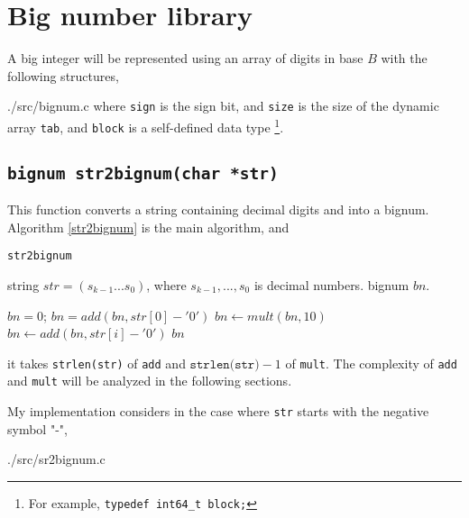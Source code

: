 \section{Big number library}
A big integer will be represented using an array of digits in base $B$ with the
following structures,

{./src/bignum.c}
where \texttt{sign} is the sign bit, and \texttt{size} is the size of the
dynamic array \texttt{tab}, and \texttt{block} is a self-defined data type
\footnote{For example, \texttt{typedef int64\_t block;}}.

\subsection{\texttt{bignum str2bignum(char *str)}}
This function converts a string containing decimal digits and into a bignum.
Algorithm \ref{str2bignum} is the main algorithm, and 
\begin{algorithm} 
\caption{\texttt{str2bignum}}
\label{str2bignum}
  \begin{algorithmic}[1]
    \Require string $str = (s_{k-1}...s_0)$, where $s_{k-1}, ..., s_0$ is
    decimal numbers.
    \Ensure bignum $bn$.

    \State $bn = 0$;
    \State $bn = add(bn, str[0]-'0')$
      \State $bn \gets mult(bn, 10)$
      \State $bn \gets add(bn, str[i]-'0')$
    \EndFor
    \State \Return $bn$
  \end{algorithmic}
\end{algorithm}
it takes \texttt{strlen(str)} of \texttt{add} and
$\texttt{strlen(str)}-1$ of \texttt{mult}. The complexity of \texttt{add} and
\texttt{mult} will be analyzed in the following sections.

My implementation considers in the case where \texttt{str} starts with the
negative symbol "-",

{./src/sr2bignum.c}

